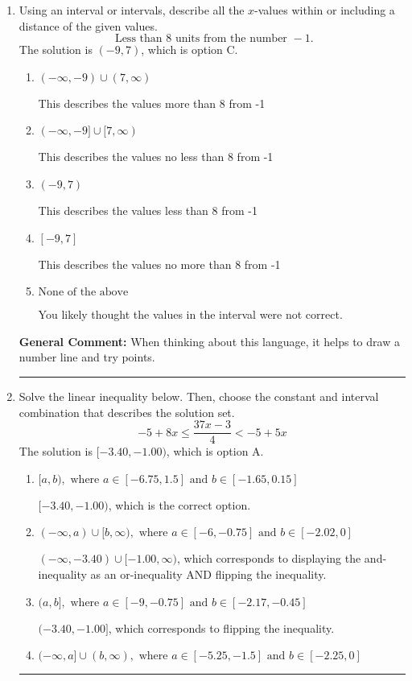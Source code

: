 \documentclass{extbook}[14pt]
\newcommand{\litem}[1]{\item #1

\rule{\textwidth}{0.4pt}}
\begin{document}
\begin{enumerate}
{\textbf{General Comment:} Remember that less/greater than or equal to includes the endpoint, while less/greater do not. Also, remember that you need to flip the inequality when you multiply or divide by a negative.
}
\litem{
Using an interval or intervals, describe all the $x$-values within or including a distance of the given values.
\[ \text{ Less than } 8 \text{ units from the number } -1. \]The solution is \( (-9, 7) \), which is option C.\begin{enumerate}[label=\Alph*.]
\item \( (-\infty, -9) \cup (7, \infty) \)

This describes the values more than 8 from -1
\item \( (-\infty, -9] \cup [7, \infty) \)

This describes the values no less than 8 from -1
\item \( (-9, 7) \)

This describes the values less than 8 from -1
\item \( [-9, 7] \)

This describes the values no more than 8 from -1
\item \( \text{None of the above} \)

You likely thought the values in the interval were not correct.
\end{enumerate}

\textbf{General Comment:} When thinking about this language, it helps to draw a number line and try points.
}
\litem{
Solve the linear inequality below. Then, choose the constant and interval combination that describes the solution set.
\[ -5 + 8 x \leq \frac{37 x - 3}{4} < -5 + 5 x \]The solution is \( [-3.40, -1.00) \), which is option A.\begin{enumerate}[label=\Alph*.]
\item \( [a, b), \text{ where } a \in [-6.75, 1.5] \text{ and } b \in [-1.65, 0.15] \)

$[-3.40, -1.00)$, which is the correct option.
\item \( (-\infty, a) \cup [b, \infty), \text{ where } a \in [-6, -0.75] \text{ and } b \in [-2.02, 0] \)

$(-\infty, -3.40) \cup [-1.00, \infty)$, which corresponds to displaying the and-inequality as an or-inequality AND flipping the inequality.
\item \( (a, b], \text{ where } a \in [-9, -0.75] \text{ and } b \in [-2.17, -0.45] \)

$(-3.40, -1.00]$, which corresponds to flipping the inequality.
\item \( (-\infty, a] \cup (b, \infty), \text{ where } a \in [-5.25, -1.5] \text{ and } b \in [-2.25, 0] \)


\end{enumerate}}
\end{enumerate}
\end{document}
